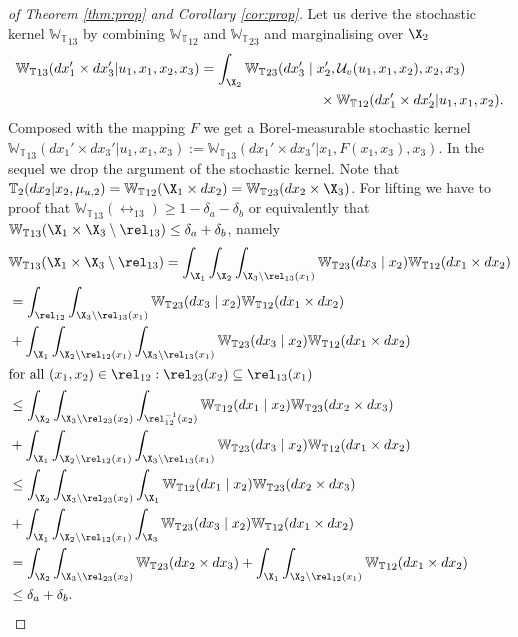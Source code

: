 \documentclass[letterpaper, 10 pt, conference]{amsart}
\theoremstyle{definition}
\theoremstyle{example}
\theoremstyle{remark}
\newcommand{\InF}{\mathcal{U}_{v}}
\newcommand{\Wt}{\mathbb{W}_{\mathbb{T}}}
\begin{document}
\begin{proof}[of Theorem \ref{thm:prop} and Corollary \ref{cor:prop}]
Let us derive the stochastic kernel ${\Wt}_{13}$ by combining ${\Wt}_{12}$ and ${\Wt}_{23}$ and marginalising over $\X_2$
\begin{align*}{\Wt}_{13}(dx_1'\times dx_3'|u_1,x_1,x_2,x_3)&= \int_{\X_2}{\Wt}_{23}(dx_3'\mid x_2',\InF(u_1,x_1,x_2),x_2,x_3)\\&\hspace{3cm}\times  {\Wt}_{12}(dx_1'\times dx_2'|u_1,x_1,x_2). \end{align*} 
Composed with the mapping $F$ we get a Borel-measurable stochastic kernel ${\Wt}_{13}(dx_1'\times dx_3'|u_1,x_1,x_3):={\Wt}_{13}(dx_1'\times dx_3'|x_1,F(x_1,x_3),x_3)$. In the sequel we drop the argument of the stochastic kernel.
Note that $\mathbb T_2(dx_2| x_2, \mu_{u,2})={\Wt}_{12}(\X_1 \times dx_2)={\Wt}_{23}( dx_2\times \X_3)$. 
For lifting we have to proof that ${\Wt}_{13}(\rel_{13})\geq 1-\delta_a-\delta_b$ or equivalently that ${\Wt}_{13}(\X_1\times \X_3\setminus \rel_{13})\leq \delta_a+\delta_b$, namely 
\begin{align*}&{\Wt}_{13}(\X_1\times\X_3\setminus \rel_{13})=\int_{\X_1} \int_{\X_2}\int_{\X_3\setminus \rel_{13}(x_1)}{\Wt}_{23}(dx_3\mid x_2) {\Wt}_{12}(dx_1\times dx_2)\\
&=\int_{\rel_{12}}\int_{\X_3\setminus \rel_{13}(x_1)}{\Wt}_{23}(dx_3\mid x_2) {\Wt}_{12}(dx_1\times dx_2)\\
&+\int_{\X_1} \int_{\X_2\setminus \rel_{12}(x_1)}\int_{\X_3\setminus \rel_{13}(x_1)}{\Wt}_{23}(dx_3\mid x_2) {\Wt}_{12}(dx_1\times dx_2)\\
\shortintertext{for all $(x_1,x_2)\in \rel_{12}: \rel_{23}(x_2)\subseteq\rel_{13}(x_1)$}
&\leq\int_{\X_2}\int_{\X_3\setminus \rel_{23}(x_2)}   \int_{\rel_{12}^{-1}(x_2)}{\Wt}_{12}(dx_1\mid x_2) {\Wt}_{23}(dx_2\times d x_3) \\
&+\int_{\X_1} \int_{\X_2\setminus \rel_{12}(x_1)}\int_{\X_3\setminus \rel_{13}(x_1)}{\Wt}_{23}(dx_3\mid x_2) {\Wt}_{12}(dx_1\times dx_2)\\
&\leq\int_{\X_2}\int_{\X_3\setminus \rel_{23}(x_2)}   \int_{\X_1}{\Wt}_{12}(dx_1\mid x_2) {\Wt}_{23}(dx_2\times d x_3) \\
&+\int_{\X_1} \int_{\X_2\setminus \rel_{12}(x_1)}\int_{\X_3}{\Wt}_{23}(dx_3\mid x_2) {\Wt}_{12}(dx_1\times dx_2)\\
&=\int_{\X_2}\int_{\X_3\setminus \rel_{23}(x_2)}     {\Wt}_{23}(dx_2\times d x_3)  +\int_{\X_1} \int_{\X_2\setminus \rel_{12}(x_1)} {\Wt}_{12}(dx_1\times dx_2)\\
&\leq \delta_a+\delta_b. 
\end{align*}   

\end{proof}
\end{document}
